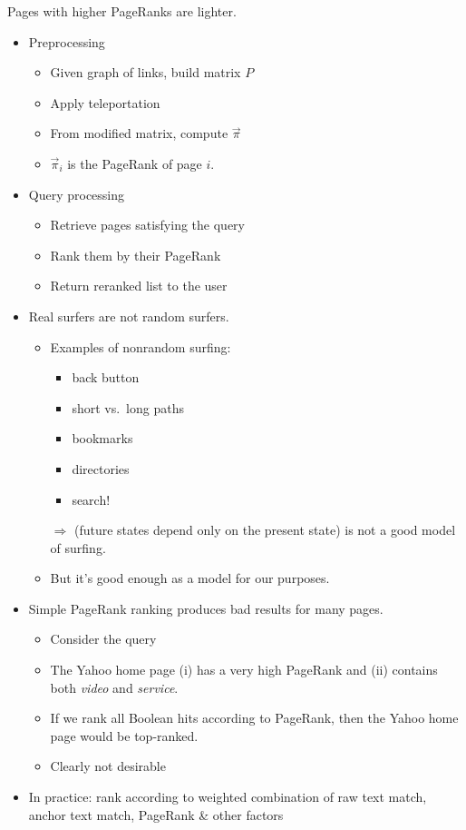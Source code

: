 \documentclass[a4paper,landscape,headrule,footrule,xetex]{foils}
\begin{document}
Pages with higher PageRanks are lighter. 


\MyLogo{}
\begin{itemize}
\item Preprocessing
\begin{itemize}
\item Given graph of links, build matrix $P$
\item Apply teleportation
\item From modified matrix, compute $\vec{\pi}$
\item $\vec{\pi}_i$ is the PageRank of page $i$.
\end{itemize}
\item Query processing
\begin{itemize}
\item  Retrieve pages satisfying the query
\item Rank them by their PageRank
\item Return reranked list to the user
\end{itemize}
\end{itemize}

\begin{itemize}
\item Real surfers are not random surfers.
\begin{itemize}
\item Examples of nonrandom surfing:
  \begin{itemize}
  \item back button
  \item short vs.\ long paths
  \item bookmarks
  \item directories
  \item search!
  \end{itemize}
\item [$\Rightarrow$]  
  (future states depend only on the present state) is
  not a good model of surfing.
\item But it's good enough as a model for our purposes.
\end{itemize}
\newpage
\item Simple PageRank ranking  produces bad results for many
  pages.  
\begin{itemize}
\item Consider the query 
\item The Yahoo home page (i) has a very high PageRank and (ii)
  contains both \emph{video} and \emph{service}.
\item If we rank all Boolean hits according to PageRank,
  then the Yahoo home page would be top-ranked.
\item Clearly not desirable
\end{itemize}
\item In practice: rank according to weighted combination of
 raw text match, anchor text match,
  PageRank \& other factors
\end{itemize}
\end{document}
